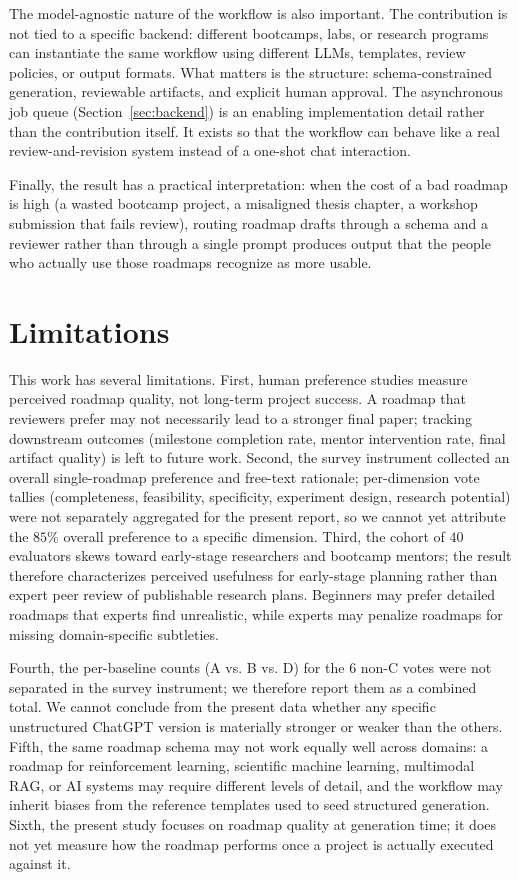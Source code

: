 \documentclass[11pt]{article}
\begin{document}
The model-agnostic nature of the workflow is also important. The contribution is not tied to a specific backend: different bootcamps, labs, or research programs can instantiate the same workflow using different LLMs, templates, review policies, or output formats. What matters is the structure: schema-constrained generation, reviewable artifacts, and explicit human approval. The asynchronous job queue (Section~\ref{sec:backend}) is an enabling implementation detail rather than the contribution itself. It exists so that the workflow can behave like a real review-and-revision system instead of a one-shot chat interaction.

Finally, the result has a practical interpretation: when the cost of a bad roadmap is high (a wasted bootcamp project, a misaligned thesis chapter, a workshop submission that fails review), routing roadmap drafts through a schema and a reviewer rather than through a single prompt produces output that the people who actually use those roadmaps recognize as more usable.

\section{Limitations}
\label{sec:limitations}

This work has several limitations. First, human preference studies measure perceived roadmap quality, not long-term project success. A roadmap that reviewers prefer may not necessarily lead to a stronger final paper; tracking downstream outcomes (milestone completion rate, mentor intervention rate, final artifact quality) is left to future work. Second, the survey instrument collected an overall single-roadmap preference and free-text rationale; per-dimension vote tallies (completeness, feasibility, specificity, experiment design, research potential) were not separately aggregated for the present report, so we cannot yet attribute the $85\%$ overall preference to a specific dimension. Third, the cohort of $40$ evaluators skews toward early-stage researchers and bootcamp mentors; the result therefore characterizes perceived usefulness for early-stage planning rather than expert peer review of publishable research plans. Beginners may prefer detailed roadmaps that experts find unrealistic, while experts may penalize roadmaps for missing domain-specific subtleties.

Fourth, the per-baseline counts (A vs. B vs. D) for the $6$ non-C votes were not separated in the survey instrument; we therefore report them as a combined total. We cannot conclude from the present data whether any specific unstructured ChatGPT version is materially stronger or weaker than the others. Fifth, the same roadmap schema may not work equally well across domains: a roadmap for reinforcement learning, scientific machine learning, multimodal RAG, or AI systems may require different levels of detail, and the workflow may inherit biases from the reference templates used to seed structured generation. Sixth, the present study focuses on roadmap quality at generation time; it does not yet measure how the roadmap performs once a project is actually executed against it.
\end{document}
